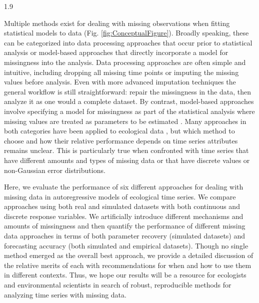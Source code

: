 \documentclass[12pt,english]{article} %
\begin{document}
\begin{linenumbers}
\begin{spacing}{1.9}
\begin{flushleft}
\hspace{1em} Multiple methods exist for dealing with missing observations when fitting statistical models to data (Fig. \ref{fig:ConceptualFigure}). Broadly speaking, these can be categorized into data processing approaches that occur prior to statistical analysis or model-based approaches that directly incorporate a model for missingness into the analysis. Data processing approaches are often simple and intuitive, including dropping all missing time points or imputing the missing values before analysis. Even with more advanced imputation techniques \citep{nakagawa_model_2011, nakagawa_missing_2015, kang2013prevention, onkelinx_working_2017, rubin1996multiple, rubin1988overview} the general workflow is still straightforward: repair the missingness in the data, then analyze it as one would a complete dataset. By contrast, model-based approaches involve specifying a model for missingness as part of the statistical analysis where missing values are treated as parameters to be estimated \citep{nadjafi2022expectation, li2019expectation, kang2013prevention, kalman_filter_1960, kong_sequential_1994}. Many approaches in both categories have been applied to ecological data \citep{Newman2023, Soldaat2007}, but which method to choose and how their relative performance depends on time series attributes remains unclear. This is particularly true when confronted with time series that have different amounts and types of missing data or that have discrete values or non-Gaussian error distributions.

\hspace{1em} Here, we evaluate the performance of six different approaches for dealing with missing data in autoregressive models of ecological time series. We compare approaches using both real and simulated datasets with both continuous and discrete response variables. We artificially introduce different mechanisms and amounts of missingness and then quantify the performance of different missing data approaches in terms of both parameter recovery (simulated datasets) and forecasting accuracy (both simulated and empirical datasets). Though no single method emerged as the overall best approach, we provide a detailed discussion of the relative merits of each with recommendations for when and how to use them in different contexts. Thus, we hope our results will be a resource for ecologists and environmental scientists in search of robust, reproducible methods for analyzing time series with missing data.

\vspace{-2.5em}

\end{flushleft}
\end{spacing}
\end{linenumbers}
\end{document}
